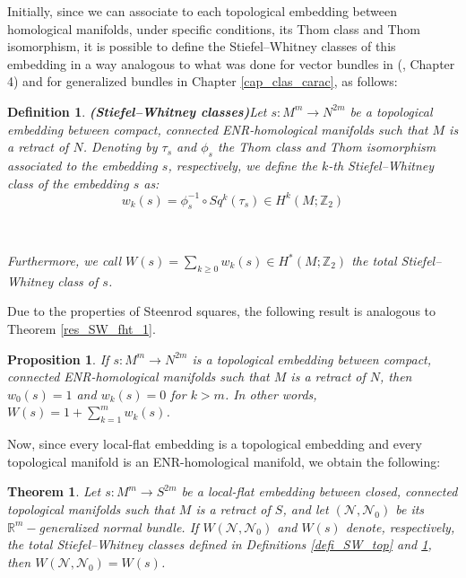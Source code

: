 \documentclass[12pt,oneside]{book}
\newtheorem{defi}   {Definition}[chapter]
\newtheorem{teo}    {Theorem}[chapter]
\newtheorem{prop}   {Proposition}[chapter]
\newcommand{\ds}{\displaystyle}
\newcommand{\R}{\mathbb{R}}
\newcommand{\Z}{\mathbb{Z}}
\begin{document}
    Initially, since we can associate to each topological embedding between homological 
    manifolds, under specific conditions, its Thom class and Thom 
    isomorphism, it is possible to define the Stiefel–Whitney classes of this embedding 
    in a way analogous to what was done for vector bundles in (\cite{milnor_1}, Chapter 4) and for generalized 
    bundles in Chapter \ref{cap_clas_carac}, as follows:

    \begin{defi}{\bf (Stiefel–Whitney classes)}\label{defi_SW_merg}
    Let $s: M^{m} \to N^{2m}$ be a topological embedding between compact, connected ENR-homological manifolds such that $M$ is a 
    retract of $N$. Denoting by $\tau_{s}$ and $\phi_{s}$ the Thom class and Thom isomorphism associated to the embedding $s$, 
    respectively, we define the $k$-th Stiefel–Whitney class of the embedding $s$ as:
    $$ w_{k}(s) = \phi_{s}^{-1} \circ Sq^{k}(\tau_{s}) \in H^{k}(M; \Z_{2}) $$

    \

    Furthermore, we call $W(s) = \ds\sum_{k \geq 0} w_{k}(s) \in H^{*}(M; \Z_{2})$ the total Stiefel–Whitney 
    class of $s$.
    \end{defi}

    Due to the properties of Steenrod squares, the following result is analogous to Theorem \ref{res_SW_fht_1}.

    \begin{prop}
        If $s: M^{m} \to N^{2m}$ is a topological embedding between compact, connected ENR-homological manifolds such that $M$ is a 
        retract of $N$, then $w_{0}(s) = 1$ and $w_{k}(s) = 0$ for $k > m$. In other words, 
        $W(s) = 1 + \ds\sum_{k = 1}^{m} w_{k}(s)$.
    \end{prop}

    Now, since every local-flat embedding is a topological embedding and every topological manifold is an ENR-homological manifold, we obtain 
    the following:

    \begin{teo}\label{SW_normal_gen}
        Let $s: M^{m} \to S^{2m}$ be a local-flat embedding between closed, connected topological manifolds such that 
        $M$ is a retract of $S$, and let $(\mathcal{N}, \mathcal{N}_{0})$ be its $\R^{m}-$generalized normal 
        bundle. If $W(\mathcal{N}, \mathcal{N}_{0})$ and $W(s)$ denote, respectively, the total Stiefel–Whitney 
        classes defined in Definitions \ref{defi_SW_top} and \ref{defi_SW_merg}, then 
        $W(\mathcal{N}, \mathcal{N}_{0}) = W(s)$.
    \end{teo}
\end{document}

